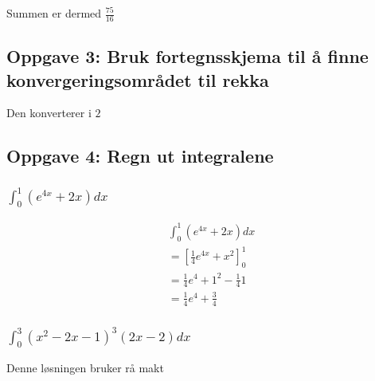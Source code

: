 \documentclass{article}
\begin{document}
Summen er dermed $\frac{75}{16}$

\subsection{Oppgave 3: Bruk fortegnsskjema til å finne konvergeringsområdet til rekka}

Den konverterer i $2$

\subsection{Oppgave 4: Regn ut integralene}

\subsubsection{$\int_{0}^{1} (e^{4x}+2x) dx$}

\begin{align*}
    & \int_{0}^{1} (e^{4x}+2x) dx \\
    & = [\frac{1}{4} e^{4x} + x^2]^1_0 \\
    &= \frac{1}{4} e^4 + 1^2 - \frac{1}{4}1 \\
    &= \frac{1}{4} e^4 + \frac{3}{4}
\end{align*}

\subsubsection{$\int_{0}^{3} (x^2-2x-1)^3(2x-2) dx$}

Denne løsningen bruker rå makt
\end{document}
